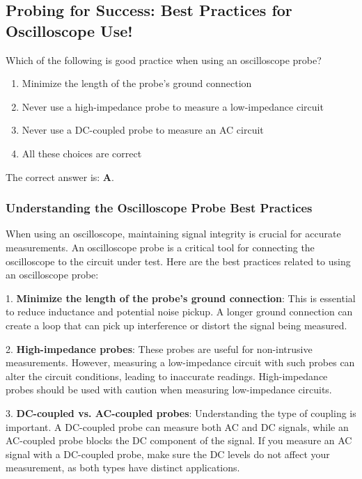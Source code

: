 \subsection{Probing for Success: Best Practices for Oscilloscope Use!}

\begin{tcolorbox}[colback=gray!10, colframe=black, title=E4A09] Which of the following is good practice when using an oscilloscope probe?
\begin{enumerate}[label=\Alph*.]
    \item Minimize the length of the probe's ground connection
    \item Never use a high-impedance probe to measure a low-impedance circuit
    \item Never use a DC-coupled probe to measure an AC circuit
    \item All these choices are correct
\end{enumerate} \end{tcolorbox}

The correct answer is: \textbf{A}.

\subsubsection{Understanding the Oscilloscope Probe Best Practices}

When using an oscilloscope, maintaining signal integrity is crucial for accurate measurements. An oscilloscope probe is a critical tool for connecting the oscilloscope to the circuit under test. Here are the best practices related to using an oscilloscope probe:

1. \textbf{Minimize the length of the probe's ground connection}: This is essential to reduce inductance and potential noise pickup. A longer ground connection can create a loop that can pick up interference or distort the signal being measured.

2. \textbf{High-impedance probes}: These probes are useful for non-intrusive measurements. However, measuring a low-impedance circuit with such probes can alter the circuit conditions, leading to inaccurate readings. High-impedance probes should be used with caution when measuring low-impedance circuits.

3. \textbf{DC-coupled vs. AC-coupled probes}: Understanding the type of coupling is important. A DC-coupled probe can measure both AC and DC signals, while an AC-coupled probe blocks the DC component of the signal. If you measure an AC signal with a DC-coupled probe, make sure the DC levels do not affect your measurement, as both types have distinct applications.

